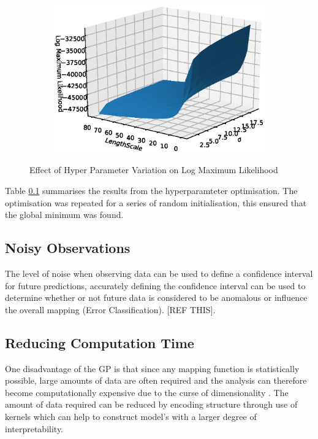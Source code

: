 \documentclass[a4paper, 10pt]{article}
\numberwithin{equation}{section}
\begin{document}
\begin{figure}[H]
\begin{subfigure}[b]{.33\textwidth}
        \includegraphics[width=\textwidth]{images/GP_Brute/l_scale_sigma_noise_0.eps}
\end{subfigure}%
\caption{Effect of Hyper Parameter Variation on Log Maximum Likelihood}
\label{fig:gp_brute}
\end{figure}


Table \ref{} summarises the results from the hyperparamteter optimisation. The optimisation was repeated for a series of random initialisation, this ensured that the global minimum was found.   

\subsection{Noisy Observations}

The level of noise when observing data can be used to define a confidence interval for future predictions, accurately defining the confidence interval can be used to determine whether or not future data is considered to be anomalous or influence the overall mapping (Error Classification). [REF THIS].

\subsection{Reducing Computation Time}
\label{sec:NonZeroMean}
One disadvantage of the GP is that since any mapping function is statistically possible, large amounts of data are often required and the analysis can therefore become computationally expensive due to the curse of dimensionality \cite{bishop_2013}. The amount of data required can be reduced by encoding structure through use of kernels which can help to construct model's with a larger degree of interpretability. 
\end{document}
